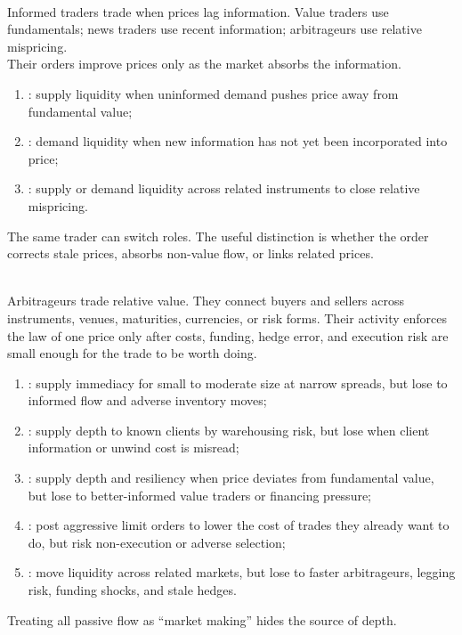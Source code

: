 \begin{taxonomy} \\
Informed traders trade when prices lag information. Value traders use fundamentals; news traders use recent information; arbitrageurs use relative mispricing.\\
Their orders improve prices only as the market absorbs the information.
\end{taxonomy}

\begin{taxonomy} 
\begin{enumerate}[label=\roman*.]
\setlength{\itemsep}{0pt}
\item {}: supply liquidity when uninformed demand pushes price away from fundamental value;
\item {}: demand liquidity when new information has not yet been incorporated into price;
\item {}: supply or demand liquidity across related instruments to close relative mispricing.
\end{enumerate}
The same trader can switch roles. The useful distinction is whether the order corrects stale prices, absorbs non-value flow, or links related prices.
\end{taxonomy}

\begin{mechanism} \\
Arbitrageurs trade relative value. They connect buyers and sellers across instruments, venues, maturities, currencies, or risk forms. Their activity enforces the law of one price only after costs, funding, hedge error, and execution risk are small enough for the trade to be worth doing.
\end{mechanism}

\begin{taxonomy} 
\begin{enumerate}[label=\roman*.]
\setlength{\itemsep}{0pt}
\item {}: supply immediacy for small to moderate size at narrow spreads, but lose to informed flow and adverse inventory moves;
\item {}: supply depth to known clients by warehousing risk, but lose when client information or unwind cost is misread;
\item {}: supply depth and resiliency when price deviates from fundamental value, but lose to better-informed value traders or financing pressure;
\item {}: post aggressive limit orders to lower the cost of trades they already want to do, but risk non-execution or adverse selection;
\item {}: move liquidity across related markets, but lose to faster arbitrageurs, legging risk, funding shocks, and stale hedges.
\end{enumerate}
Treating all passive flow as ``market making'' hides the source of depth.
\end{taxonomy}

